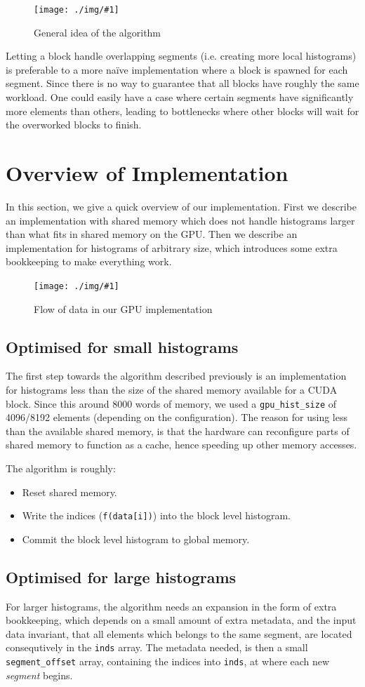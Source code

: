 \documentclass[12pt, a4paper, hidelinks]{article}
\newcommand{\fig}[3]{
\begin{figure}[h]
  \begin{center}
    \texttt{[image: ./img/\#1]}
  \end{center}
  \caption{#3}
  \label{fig:#1}
\end{figure}
}
\renewcommand{\tt}[1]{\texttt{#1}}
\renewcommand{\it}[1]{\textit{#1}}
\begin{document}
\fig{overview}{140}{General idea of the algorithm}

Letting a block handle overlapping segments (i.e. creating more local histograms)
is preferable to a more naïve implementation where a block is spawned
for each segment. Since there is no way to guarantee that all blocks have
roughly the same workload.
One could easily have a case where certain segments have significantly
more elements than others, leading to bottlenecks where other blocks will
wait for the overworked blocks to finish.

\section{Overview of Implementation}
In this section, we give a quick overview of our implementation.
First we describe an implementation with shared memory which does not handle
histograms larger than what fits in shared memory on the GPU.
Then we describe an implementation for histograms of arbitrary size,
which introduces some extra bookkeeping to make everything work.

\fig{device-dia}{140}{Flow of data in our GPU implementation}

\subsection{Optimised for small histograms}
The first step towards the algorithm described previously is an implementation
for histograms less than the size of the shared memory available for a CUDA block.
Since this around 8000 words of memory,
we used a \tt{gpu\_hist\_size} of 4096/8192 elements (depending on the configuration).
The reason for using less than the available shared memory, is that the hardware can
reconfigure parts of shared memory to function as a cache, hence speeding
up other memory accesses.

The algorithm is roughly:

\begin{itemize}
\item Reset shared memory.
\item Write the indices (\tt{f(data[i])}) into the block level histogram.
\item Commit the block level histogram to global memory.
\end{itemize}

\subsection{Optimised for large histograms}
For larger histograms, the algorithm needs an expansion in the form
of extra bookkeeping, which depends on a small amount of extra metadata, and
the input data invariant, that all elements which belongs to the same segment,
are located consequtively in the \tt{inds} array.
The metadata needed, is then a small \tt{segment\_offset} array,
containing the indices into \tt{inds}, at where each new \it{segment} begins.
\end{document}

